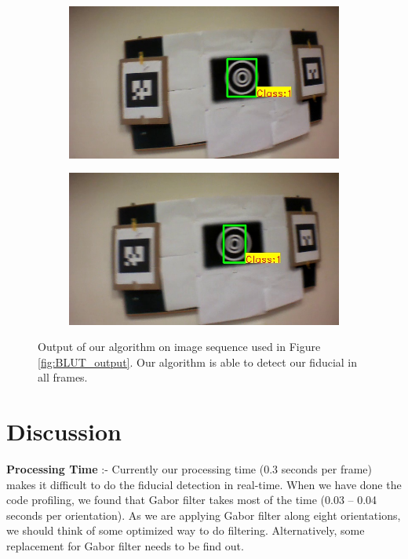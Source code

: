 \documentclass[runningheads]{llncs}
\begin{document}
\begin{figure}
\begin{subfigure}[b]{.19\textwidth}
\end{subfigure}
\begin{subfigure}[b]{.19\textwidth}
\includegraphics[width=\linewidth]{output14.jpg}
\end{subfigure}
\begin{subfigure}[b]{.19\textwidth}
\includegraphics[width=\linewidth]{output15.jpg}
\end{subfigure}
\caption{Output of our algorithm on image sequence used in
Figure \ref{fig:BLUT_output}. Our algorithm is able to detect our fiducial in
all frames.}
\label{fig:our_output}
\end{figure}

\section{Discussion}

\noindent\textbf{Processing Time} :-  Currently our processing time (0.3 seconds
per frame) makes it difficult to do the fiducial detection in real-time. When we have
done the code profiling, we found that Gabor filter takes most of the time (0.03
-- 0.04 seconds per orientation). As we are applying Gabor filter along eight
orientations, we should think of some optimized way to do filtering.
Alternatively, some replacement for Gabor filter needs to be find out.  
\end{document}
